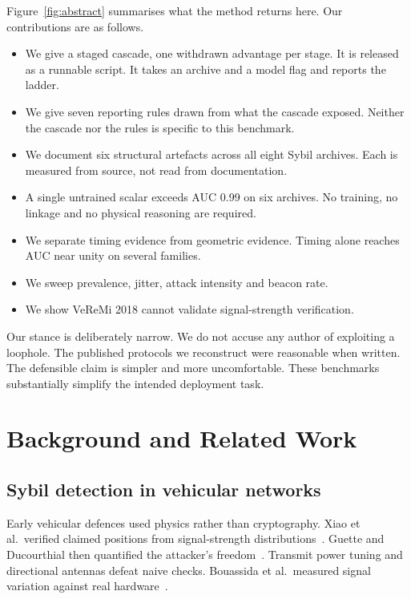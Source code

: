 \documentclass[journal,twoside]{IEEEtran}
\begin{document}
Figure~\ref{fig:abstract} summarises what the method returns here.
Our contributions are as follows.

\begin{itemize}
  \item We give a staged cascade, one withdrawn advantage per stage.
        It is released as a runnable script.
        It takes an archive and a model flag and reports the ladder.
  \item We give seven reporting rules drawn from what the cascade exposed.
        Neither the cascade nor the rules is specific to this benchmark.
  \item We document six structural artefacts across all eight Sybil archives.
        Each is measured from source, not read from documentation.
  \item A single untrained scalar exceeds AUC 0.99 on six archives.
        No training, no linkage and no physical reasoning are required.
  \item We separate timing evidence from geometric evidence.
        Timing alone reaches AUC near unity on several families.
  \item We sweep prevalence, jitter, attack intensity and beacon rate.
  \item We show VeReMi 2018 cannot validate signal-strength verification.
\end{itemize}

Our stance is deliberately narrow.
We do not accuse any author of exploiting a loophole.
The published protocols we reconstruct were reasonable when written.
The defensible claim is simpler and more uncomfortable.
These benchmarks substantially simplify the intended deployment task.

\section{Background and Related Work}

\subsection{Sybil detection in vehicular networks}

Early vehicular defences used physics rather than cryptography.
Xiao et al.\ verified claimed positions from signal-strength distributions~\cite{xiao2006}.
Guette and Ducourthial then quantified the attacker's freedom~\cite{guette2007}.
Transmit power tuning and directional antennas defeat naive checks.
Bouassida et al.\ measured signal variation against real hardware~\cite{bouassida2009}.
\end{document}
